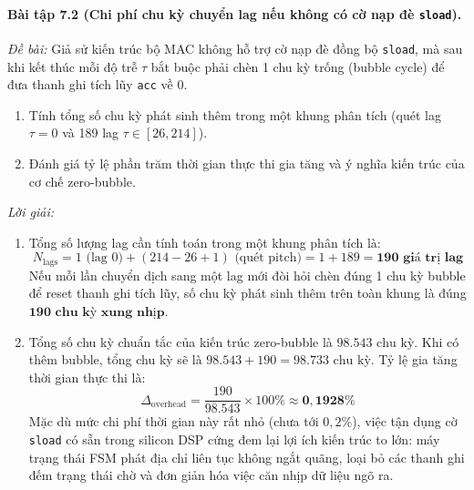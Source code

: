 \paragraph{Bài tập 7.2 (Chi phí chu kỳ chuyển lag nếu không có cờ nạp đè \texttt{sload}).}
\textit{Đề bài:} Giả sử kiến trúc bộ MAC không hỗ trợ cờ nạp đè đồng bộ \texttt{sload}, mà sau khi kết thúc mỗi độ trễ $\tau$ bắt buộc phải chèn 1 chu kỳ trống (bubble cycle) để đưa thanh ghi tích lũy \texttt{acc} về 0.
\begin{enumerate}[label=(\alph*), itemsep=2pt]
    \item Tính tổng số chu kỳ phát sinh thêm trong một khung phân tích (quét lag $\tau = 0$ và 189 lag $\tau \in [26, 214]$).
    \item Đánh giá tỷ lệ phần trăm thời gian thực thi gia tăng và ý nghĩa kiến trúc của cơ chế zero-bubble.
\end{enumerate}

\textit{Lời giải:}
\begin{enumerate}[label=(\alph*), itemsep=2pt]
    \item Tổng số lượng lag cần tính toán trong một khung phân tích là:
    \begin{equation}
    N_{\text{lags}} = 1\text{ (lag 0)} + (214 - 26 + 1)\text{ (quét pitch)} = 1 + 189 = \mathbf{190\text{ giá trị lag}}
    \end{equation}
    Nếu mỗi lần chuyển dịch sang một lag mới đòi hỏi chèn đúng 1 chu kỳ bubble để reset thanh ghi tích lũy, số chu kỳ phát sinh thêm trên toàn khung là đúng $\mathbf{190\text{ chu kỳ xung nhịp}}$.
    
    \item Tổng số chu kỳ chuẩn tắc của kiến trúc zero-bubble là $98.543\text{ chu kỳ}$. Khi có thêm bubble, tổng chu kỳ sẽ là $98.543 + 190 = 98.733\text{ chu kỳ}$. Tỷ lệ gia tăng thời gian thực thi là:
    \begin{equation}
    \Delta_{\text{overhead}} = \frac{190}{98.543} \times 100\% \approx \mathbf{0{,}1928\%}
    \end{equation}
    Mặc dù mức chi phí thời gian này rất nhỏ (chưa tới $0{,}2\%$), việc tận dụng cờ \texttt{sload} có sẵn trong silicon DSP cứng đem lại lợi ích kiến trúc to lớn: máy trạng thái FSM phát địa chỉ liên tục không ngắt quãng, loại bỏ các thanh ghi đếm trạng thái chờ và đơn giản hóa việc căn nhịp dữ liệu ngõ ra.
\end{enumerate}

